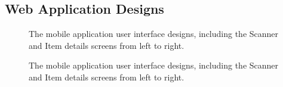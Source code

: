 \documentclass[a4paper,11pt]{report}
\begin{document}
\begin{appendix}
    \section{Web Application Designs}
    \begin{figure}[H]
        \centering
        \caption{The mobile application user interface designs, including the Scanner and Item details screens from left to right.}
        \label{fig:mobileUIpt2}
    \end{figure}
    \begin{figure}[H]
        \centering
        \caption{The mobile application user interface designs, including the Scanner and Item details screens from left to right.}
        \label{fig:mobileUIpt2}
    \end{figure}
    \begin{figure}[H]
        \centering

\end{figure}
\end{appendix}
\end{document}
